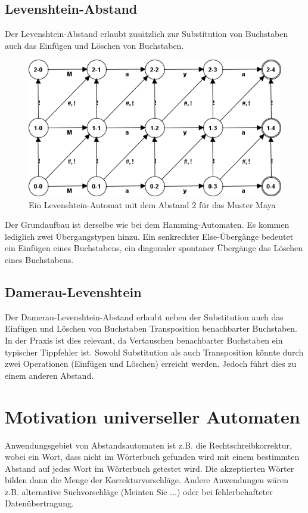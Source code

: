\subsection{Levenshtein-Abstand}
Der Levenshtein-Abstand erlaubt zusätzlich zur Substitution von Buchstaben auch das Einfügen und Löschen von Buchstaben.

\begin{figure}[!htb]
\centering
\includegraphics[scale=0.7]{pic/automata/levenshtein}%
\caption{Ein Levenshtein-Automat mit dem Abstand 2 für das Muster Maya}%
\end{figure}
Der Grundaufbau ist derselbe wie bei dem Hamming-Automaten. Es kommen lediglich zwei Übergangstypen hinzu. Ein senkrechter Else-Übergänge bedeutet ein Einfügen eines Buchstabens, ein diagonaler spontaner Übergänge das Löschen eines Buchstabens.

\subsection{Damerau-Levenshtein}
Der Damerau-Levenshtein-Abstand erlaubt neben der Substitution auch das Einfügen und Löschen von Buchstaben Transposition benachbarter Buchstaben. In der Praxis ist dies relevant, da Vertauschen benachbarter Buchstaben ein typischer Tippfehler ist. Sowohl Substitution als auch Transposition könnte durch zwei Operationen (Einfügen und Löschen) erreicht werden. Jedoch führt dies zu einem anderen Abstand.
\section{Motivation universeller Automaten}
Anwendungsgebiet von Abstandsautomaten ist z.B. die Rechtschreibkorrektur, wobei ein Wort, dass nicht im Wörterbuch gefunden wird mit einem bestimmten Abstand auf jedes Wort im Wörterbuch getestet wird. Die akzeptierten Wörter bilden dann die Menge der Korrekturvorschläge. Andere Anwendungen wären z.B. alternative Suchvorschläge (\glqq Meinten Sie ...\grqq) oder bei fehlerbehafteter Datenübertragung.

